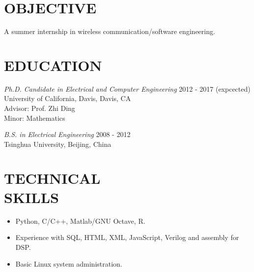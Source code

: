 \documentclass[margin]{res} %
\begin{document}
    \begin{resume}

     
        \section{OBJECTIVE}  
        A summer internship in wireless communication/software engineering.
    
    
        \section{EDUCATION}
    
        {\sl Ph.D. Candidate in Electrical and Computer Engineering} \hfill 2012 -
        2017 (expcected) \\
        University of California, Davis, Davis, CA \\
        Advisor: Prof. Zhi Ding \\
        Minor: Mathematics 
        
        {\sl B.S. in Electrical Engineering}  \hfill 2008 - 2012\\
        Tsinghua University, Beijing, China
       
    
        \section{TECHNICAL \\ SKILLS}
        
        \begin{itemize}
            \item Python, C/C++, Matlab/GNU Octave, R.
            \item Experience with SQL, HTML, XML, JavaScript, Verilog and assembly
            for DSP.
            \item Basic Linux system administration.
        \end{itemize} 
    

\end{resume}
\end{document}
